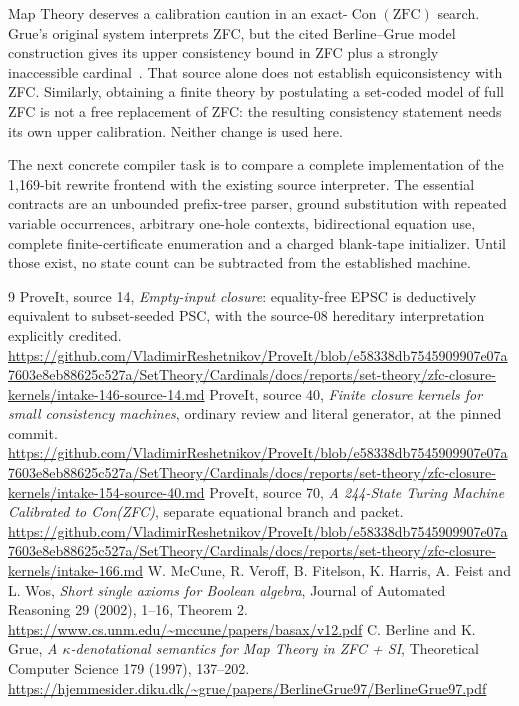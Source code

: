 \documentclass[11pt]{article}
\newcommand{\Con}{\operatorname{Con}}
\begin{document}
Map Theory deserves a calibration caution in an exact-$\Con(\mathrm{ZFC})$ search. Grue's original system interprets ZFC, but the cited Berline--Grue model construction gives its upper consistency bound in ZFC plus a strongly inaccessible cardinal~\cite{map}. That source alone does not establish equiconsistency with ZFC. Similarly, obtaining a finite theory by postulating a set-coded model of full ZFC is not a free replacement of ZFC: the resulting consistency statement needs its own upper calibration. Neither change is used here.

The next concrete compiler task is to compare a complete implementation of the 1,169-bit rewrite frontend with the existing source interpreter. The essential contracts are an unbounded prefix-tree parser, ground substitution with repeated variable occurrences, arbitrary one-hole contexts, bidirectional equation use, complete finite-certificate enumeration and a charged blank-tape initializer. Until those exist, no state count can be subtracted from the established machine.

\begin{thebibliography}{9}
 ProveIt, source 14, \emph{Empty-input closure}: equality-free EPSC is deductively equivalent to subset-seeded PSC, with the source-08 hereditary interpretation explicitly credited.\newline
\url{https://github.com/VladimirReshetnikov/ProveIt/blob/e58338db7545909907e07a7603e8eb88625c527a/SetTheory/Cardinals/docs/reports/set-theory/zfc-closure-kernels/intake-146-source-14.md}
 ProveIt, source 40, \emph{Finite closure kernels for small consistency machines}, ordinary review and literal generator, at the pinned commit.\newline
\url{https://github.com/VladimirReshetnikov/ProveIt/blob/e58338db7545909907e07a7603e8eb88625c527a/SetTheory/Cardinals/docs/reports/set-theory/zfc-closure-kernels/intake-154-source-40.md}
 ProveIt, source 70, \emph{A 244-State Turing Machine Calibrated to Con(ZFC)}, separate equational branch and packet.\newline
\url{https://github.com/VladimirReshetnikov/ProveIt/blob/e58338db7545909907e07a7603e8eb88625c527a/SetTheory/Cardinals/docs/reports/set-theory/zfc-closure-kernels/intake-166.md}
 W. McCune, R. Veroff, B. Fitelson, K. Harris, A. Feist and L. Wos, \emph{Short single axioms for Boolean algebra}, Journal of Automated Reasoning 29 (2002), 1--16, Theorem 2.\newline
\url{https://www.cs.unm.edu/~mccune/papers/basax/v12.pdf}
 C. Berline and K. Grue, \emph{A $\kappa$-denotational semantics for Map Theory in ZFC + SI}, Theoretical Computer Science 179 (1997), 137--202.\newline
\url{https://hjemmesider.diku.dk/~grue/papers/BerlineGrue97/BerlineGrue97.pdf}
\end{thebibliography}
\end{document}
